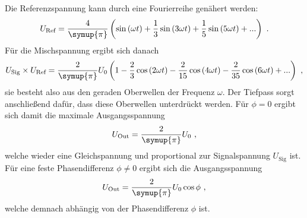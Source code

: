     Die Referenzspannung kann durch eine Fourierreihe genähert werden:
    \begin{equation*}
        U_\text{Ref} = \frac{4}{\symup{\pi}} \left(\sin{(\omega t)} + \frac{1}{3}\sin{(3\omega t)} + \frac{1}{5}\sin{(5\omega t)} + ... \right) \ .
    \end{equation*}
    Für die Mischspannung ergibt sich danach
    \begin{equation*}
        U_\text{Sig} \times U_\text{Ref} = \frac{2}{\symup{\pi}} U_0 \left(1 - \frac{2}{3}\cos{(2\omega t)} - \frac{2}{15}\cos{(4\omega t)} - \frac{2}{35}\cos{(6\omega t)} + ... \right) \ ,
    \end{equation*}
    sie besteht also aus den geraden Oberwellen der Frequenz $\omega$.
    Der Tiefpass sorgt anschließend dafür,
    dass diese Oberwellen unterdrückt werden.
    Für $\phi = 0$ ergibt sich damit die maximale Ausgangsspannung
    \begin{equation*}
        U_\text{Out} = \frac{2}{\symup{\pi}} U_0 \ ,
    \end{equation*}
    welche wieder eine Gleichspannung und proportional zur Signalspannung $U_\text{Sig}$ ist.
    Für eine feste Phasendifferenz $\phi \neq 0$ ergibt sich die Ausgangsspannung
    \begin{equation}
        U_\text{Out} = \frac{2}{\symup{\pi}} U_0 \cos{\phi} \ ,
        \label{eqn:ausgangsspannung_phase}
    \end{equation}
    welche demnach abhängig von der Phasendifferenz $\phi$ ist.
